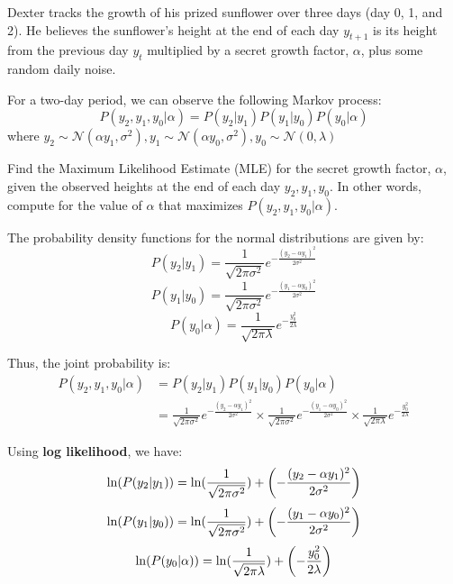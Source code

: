 \documentclass[a4paper, 10pt]{article}
\begin{document}
\begin{tosubmit}
\begin{problem}
Dexter tracks the growth of his prized sunflower over three days (day 0, 1, and 2).
He believes the sunflower's height at the end of each day \( y_{t+1} \) is its height from the previous day \( y_t \)
multiplied by a secret growth factor, \( \alpha \), plus some random daily noise.

\vspace{3mm}

For a two-day period, we can observe the following Markov process:
\[
    P(y_2, y_1, y_0 | \alpha) = P(y_2|y_1)P(y_1|y_0)P(y_0 |\alpha)
\]
\noindent where \( y_2 \sim \mathcal{N}(\alpha y_1, \sigma^2), y_1 \sim \mathcal{N}(\alpha y_0, \sigma^2), y_0 \sim \mathcal{N}(0,\lambda) \)

\vspace{3mm}

\noindent Find the Maximum Likelihood Estimate (MLE) for the secret growth factor, \( \alpha \), given the observed heights at the end of each day \( y_2,y_1,y_0 \).
In other words, compute for the value of \( \alpha \) that maximizes \( P(y_2,y_1,y_0|\alpha) \).
\end{problem}

\newpage

\par\noindent\submitsolution
The probability density functions for the normal distributions are given by:
\[
    P(y_2|y_1) = \frac{1}{\sqrt{2\pi\sigma^2}} e^{-\frac{(y_2 - \alpha y_1)^2}{2\sigma^2}}
\]
\[
    P(y_1|y_0) = \frac{1}{\sqrt{2\pi\sigma^2}} e^{-\frac{(y_1 - \alpha y_0)^2}{2\sigma^2}}
\]
\[
    P(y_0|\alpha) = \frac{1}{\sqrt{2\pi\lambda}} e^{-\frac{y_0^2}{2\lambda}}
\]

Thus, the joint probability is:
\begin{align*}
    P(y_2, y_1, y_0| \alpha) &= P(y_2|y_1)P(y_1|y_0)P(y_0| \alpha)\\
    &= \frac{1}{\sqrt{2\pi\sigma^2}} e^{-\frac{(y_2 - \alpha y_1)^2}{2\sigma^2}} \times \frac{1}{\sqrt{2\pi\sigma^2}} e^{-\frac{(y_1 - \alpha y_0)^2}{2\sigma^2}} \times \frac{1}{\sqrt{2\pi\lambda}} e^{-\frac{y_0^2}{2\lambda}}
\end{align*}

Using \textbf{log likelihood}, we have:
\[
    \ln(P(y_2|y_1)) = \ln(\frac{1}{\sqrt{2\pi\sigma^2}}) + \left( -\frac{(y_2-\alpha y_1)^2}{2\sigma^2} \right)
\]
\[
    \ln(P(y_1|y_0)) = \ln(\frac{1}{\sqrt{2\pi\sigma^2}}) + \left( -\frac{(y_1-\alpha y_0)^2}{2\sigma^2} \right)
\]
\[
    \ln(P(y_0|\alpha)) = \ln(\frac{1}{\sqrt{2\pi\lambda}}) + \left( -\frac{y_0^2}{2\lambda}\right)
\]


\end{tosubmit}
\end{document}

